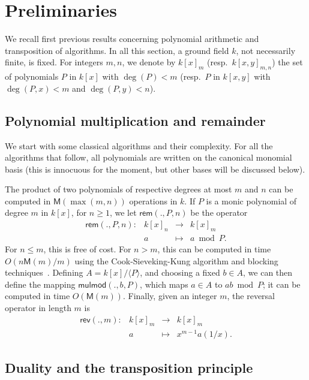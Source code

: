\documentclass{sig-alternate}
\def\M {\ensuremath{\mathsf{M}}}
\def\rem {\ensuremath{\mathsf{rem}}}
\def\mulmod {\ensuremath{\mathsf{mulmod}}}
\def\rev {\ensuremath{\mathsf{rev}}}
\newcounter{algo}
\newcommand{\ang}[1]{\langle#1\rangle}
\begin{document}
\section{Preliminaries}\label{sec:prelim}

We recall first previous results concerning polynomial arithmetic and
transposition of algorithms. In all this section, a ground field $k$,
not necessarily finite, is fixed. For integers $m,n$, we denote by
$k[x]_m$ (resp.\ $k[x,y]_{m,n}$) the set of polynomials $P$ in $k[x]$
with $\deg(P) <m$ (resp.\ $P$ in $k[x,y]$ with $\deg(P,x) <m$ and
$\deg(P,y)<n$).


\subsection{Polynomial multiplication and remainder}

We start with some classical algorithms and their complexity. For all
the algorithms that follow, all polynomials are written on the
canonical monomial basis (this is innocuous for the moment, but other
bases will be discussed below).

The product of two polynomials of respective degrees at most $m$ and
$n$ can be computed in $\M(\max(m,n))$ operations in $k$.  If $P$ is a
monic polynomial of degree $m$ in $k[x]$, for $n \ge 1$, we let
$\rem(.,P,n)$ be the operator
$$
\begin{array}{cccc}
\rem(.,P,n): &k[x]_n& \to &k[x]_{m}\\
& a & \mapsto & a \bmod P.
\end{array}$$ 
For $n \le m$, this is free of cost. For $n > m$, this can be computed
in time $O(n\M(m)/m)$ using the Cook-Sieveking-Kung algorithm and
blocking techniques~\cite[Ch.~5.1.3]{Bostan10}. Defining
$A=k[x]/\ang{P}$, and choosing a fixed $b \in A$, we can then define
the mapping $\mulmod(.,b,P)$, which maps $a \in A$ to $ab \bmod P$; it
can be computed in time $O(\M(m))$. Finally, given an integer $m$, the
reversal operator in length $m$ is 
$$
\begin{array}{cccc} \rev(.,m): &k[x]_m &\to& k[x]_m \\ & a & \mapsto &
x^{m-1} a(1/x).
\end{array}$$ 


\subsection{Duality and the transposition principle}\label{ssec:duality}
\end{document}
